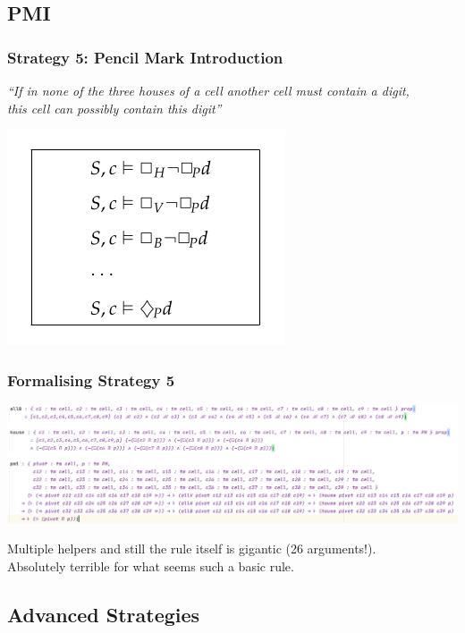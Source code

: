 \documentclass[aspectratio=169, usenames, dvipsnames]{beamer}
\begin{document}
\subsection{PMI}

\begin{frame}
\frametitle{Strategy 5: Pencil Mark Introduction}
\begin{center}
\emph{``If in none of the three houses of a cell another cell must contain a digit,\\
this cell can possibly contain this digit''}
\bigskip

\includegraphics[height=0.4\textheight,keepaspectratio]{images/strategy_nd_pmi.png} 
\end{center}

\end{frame}

\begin{frame}
\frametitle{Formalising Strategy 5}
\begin{center}
\includegraphics[width=\textwidth, keepaspectratio]{images/strategy_form_pmi.png}
\pause\bigskip

Multiple helpers and still the rule itself is gigantic (26 arguments!).\\
Absolutely terrible for what seems such a basic rule.
\end{center}
\end{frame}

\subsection{Advanced Strategies}
\end{document}
